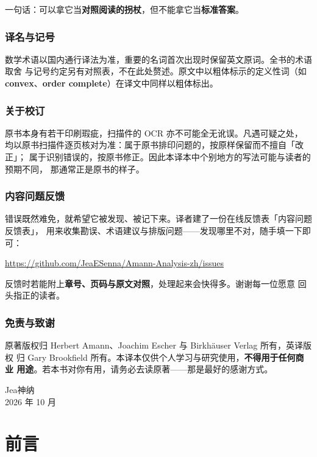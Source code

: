 一句话：可以拿它当\textbf{对照阅读的拐杖}，但不能拿它当\textbf{标准答案}。

\subsection*{译名与记号}

数学术语以国内通行译法为准，重要的名词首次出现时保留英文原词。全书的术语取舍
与记号约定另有对照表，不在此处赘述。原文中以粗体标示的定义性词（如
\textbf{convex}、\textbf{order complete}）在译文中同样以粗体标出。

\subsection*{关于校订}

原书本身有若干印刷瑕疵，扫描件的 OCR 亦不可能全无讹误。凡遇可疑之处，
均以原书扫描件逐页核对为准：属于原书排印问题的，按原样保留而不擅自「改正」；
属于识别错误的，按原书修正。因此本译本中个别地方的写法可能与读者的预期不同，
那通常正是原书的样子。

\clearpage
\subsection*{内容问题反馈}

错误既然难免，就希望它被发现、被记下来。译者建了一份在线反馈表「内容问题反馈表」，
用来收集勘误、术语建议与排版问题——发现哪里不对，随手填一下即可：

\begin{center}
\url{https://github.com/JeaESenna/Amann-Analysis-zh/issues}
\end{center}


反馈时若能附上\textbf{章号、页码与原文对照}，处理起来会快得多。谢谢每一位愿意
回头指正的读者。

\subsection*{免责与致谢}

原著版权归 Herbert Amann、Joachim Escher 与 Birkhäuser Verlag 所有，英译版权
归 Gary Brookfield 所有。本译本仅供个人学习与研究使用，\textbf{不得用于任何商业
用途}。若本书对你有用，请务必去读原著——那是最好的感谢方式。

\vspace{2ex}
\begin{flushright}
Jea神纳\\
2026 年 10 月
\end{flushright}
\chapter*{前言}

